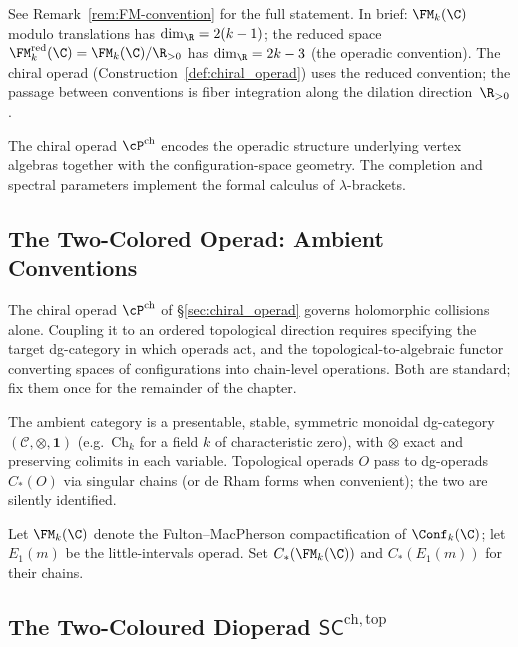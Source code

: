 \begin{remark}
\label{rem:FM-dimension-conventions}
See Remark~\ref{rem:FM-convention} for the full statement.
In brief: $\FM_k(\C)$ modulo translations has $\dim_\R = 2(k-1)$;
the reduced space $\FM_k^{\mathrm{red}}(\C) = \FM_k(\C)/\R_{>0}$
has $\dim_\R = 2k-3$ (the operadic convention).
The chiral operad (Construction~\ref{def:chiral_operad}) uses
the reduced convention; the passage between conventions is fiber
integration along the dilation direction~$\R_{>0}$.
\end{remark}

\begin{remark}
The chiral operad $\cP^{\mathrm{ch}}$ encodes the operadic
structure underlying vertex algebras together with the configuration-space
geometry. The completion and spectral parameters implement the formal
calculus of $\lambda$-brackets.
\end{remark}

\subsection{The Two-Colored Operad: Ambient Conventions}
\label{sec:SC-operad-foundations}

The chiral operad $\cP^{\mathrm{ch}}$ of
\S\ref{sec:chiral_operad} governs holomorphic collisions alone.
Coupling it to an ordered topological direction requires specifying
the target dg-category in which operads act, and the
topological-to-algebraic functor converting spaces of configurations
into chain-level operations. Both are standard; fix them once for
the remainder of the chapter.

The ambient category is a presentable, stable, symmetric monoidal
dg-category $(\mathcal C,\otimes,\mathbf 1)$ (e.g.\ $\mathrm{Ch}_k$
for a field $k$ of characteristic zero), with $\otimes$ exact and
preserving colimits in each variable. Topological operads $O$ pass
to dg-operads $C_\ast(O)$ via singular chains (or de Rham forms when
convenient); the two are silently identified.

\begin{notation}
\label{not:fm-e1}
Let $\FM_k(\C)$ denote the Fulton--MacPherson compactification of $\Conf_k(\C)$; let $E_1(m)$ be the little-intervals operad. Set $C_\ast(\FM_k(\C))$ and $C_\ast(E_1(m))$ for their chains.
\end{notation}

\subsection{The Two-Coloured Dioperad $\mathsf{SC}^{\mathrm{ch,top}}$}
\label{subsec:sc-def}


